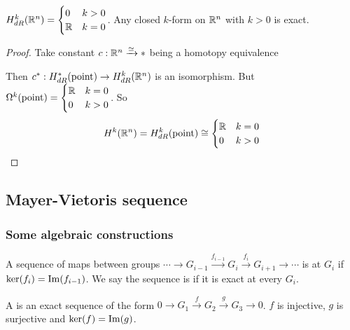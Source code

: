 
\begin{corollary}\label{Poincare Lemma}
    $ H^k_{dR}(\mathbb R^n)=\displaystyle\begin{cases}
       0 &k>0\\
       \mathbb R &k=0
    \end{cases} $. \ie Any closed  $ k $-form on  $ \mathbb R^n $ with  $ k>0 $  is exact. 
\end{corollary}
\begin{proof}
   Take constant  $ c:\mathbb R^n\xrightarrow{\simeq} *$ being a homotopy equivalence

   Then  $ c^*:H^*_{dR}(\text{point})\rightarrow H_{dR}^k(\mathbb R^n) $ is an isomorphism. But  $ \Omega^k(\text{point})=\begin{cases}
       \mathbb R &k=0\\
       0 &k>0
   \end{cases}  $. So
   \begin{equation*}
       H^k(\mathbb R^n)=H^k_{dR}(\text{point})\cong\begin{cases}
           \mathbb R&k=0\\
           0&k>0
       \end{cases}
   \end{equation*} 
\end{proof}
\subsection{Mayer-Vietoris sequence}
\subsubsection{Some algebraic constructions}
A sequence of maps between groups  $ \cdots\rightarrow G_{i-1}\xrightarrow{f_{i-1}} G_i\xrightarrow{f_i} G_{i+1}\rightarrow\cdots $ is  at  $ G_i $  if  $ \ker(f_i)=\mathrm{Im}(f_{i-1}) $. 
We say the sequence is  if it is exact at every  $ G_i$.

A  is an exact sequence of the form  $ 0\rightarrow G_1\xrightarrow{f} G_2\xrightarrow{g} G_3\rightarrow 0 $. \ie  $ f  $ is injective,  $ g  $ is surjective and  $ \ker(f)=\mathrm{Im}(g) $.


